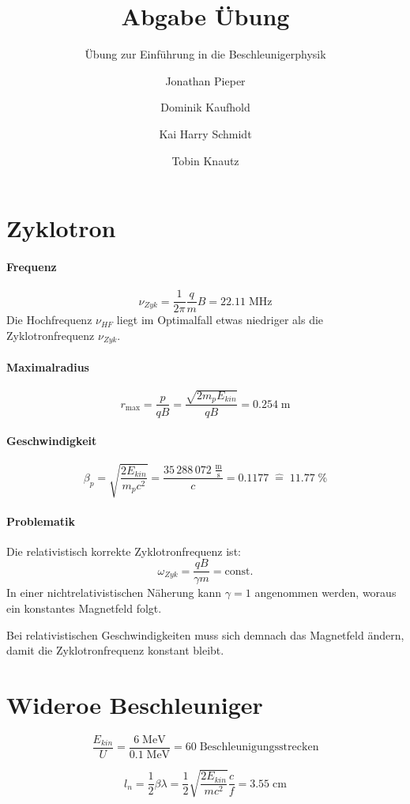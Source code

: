 \documentclass[12pt,DIV=15,a4paper,twoside,draft=false]{scrartcl}
\author{Jonathan Pieper\and Dominik Kaufhold\and Kai Harry Schmidt\and Tobin Knautz}
\title{Abgabe Übung \blatt{}}
\subtitle{Übung zur Einführung in die Beschleunigerphysik}
\newcommand{\blatt}{3}
\begin{document}
\maketitle
\titlelabel{Aufgabe \blatt{}.\thesection{} }

\section{Zyklotron}
\paragraph{Frequenz}
$$ ν_{Zyk} = \frac{1}{2π} \frac{q}{m} B = 22.11\;\mathrm{MHz} $$
Die Hochfrequenz $ν_{HF}$ liegt im Optimalfall etwas niedriger als die Zyklotronfrequenz $ν_{Zyk}$.

\paragraph{Maximalradius}
$$ r_{\mathrm{max}} = \frac{p}{qB} =  \frac{\sqrt{2m_p E_{kin}}}{qB} = 0.254\;\mathrm{m} $$

\paragraph{Geschwindigkeit}
$$ β_p = \sqrt{\frac{2E_{kin}}{m_p c^2}} = \frac{35\,288\,072\;\mathrm{\frac{m}{s}}}{c} = 0.1177 {\;}\hat{=}{\;} 11.77\;\% $$

\paragraph{Problematik}
Die relativistisch korrekte Zyklotronfrequenz ist:
$$ ω_{Zyk} = \frac{qB}{γm} = \mathrm{const.} $$
In einer nichtrelativistischen Näherung kann $γ=1$ angenommen werden, woraus ein konstantes Magnetfeld folgt.

Bei relativistischen Geschwindigkeiten muss sich demnach das Magnetfeld ändern, damit die Zyklotronfrequenz konstant bleibt.

\section{Wideroe Beschleuniger}
$$ \frac{E_{kin}}{U} = \frac{6\;\mathrm{MeV}}{0.1\;\mathrm{MeV}} = 60\;\mathrm{Beschleunigungsstrecken} $$

$$ l_n = \frac{1}{2} β λ = \frac{1}{2} \sqrt{\frac{2E_{kin}}{mc^2}} \frac{c}{f} = 3.55\;\mathrm{cm} $$
\end{document}
